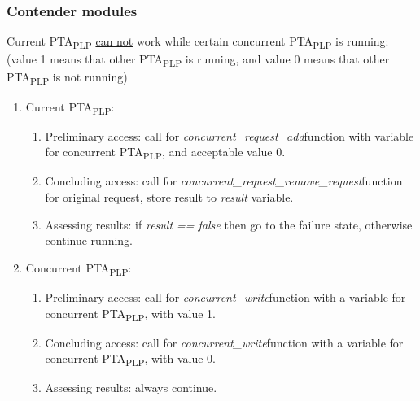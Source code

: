 \subsubsection{Contender modules \label{memory_module_applications_contender_modules}}
Current PTA\textsubscript{PLP} \underline{can not} work while certain concurrent PTA\textsubscript{PLP} is running: (value 1 means that other PTA\textsubscript{PLP} is running, and value 0 means that other PTA\textsubscript{PLP} is not running)
\begin{enumerate}  
\item Current PTA\textsubscript{PLP}:
\begin{enumerate}  
\item Preliminary access: call for \textcolor{ColorUppaalFunction}{\textit{concurrent_request_add}}​ function with variable for concurrent PTA\textsubscript{PLP}, and acceptable value 0.  
\item Concluding access: call for \textcolor{ColorUppaalFunction}{\textit{concurrent_request_remove_request}}​ function for original request, store result to \textcolor{ColorEdgeGuard}{\textit{result}} variable.  
\item Assessing results: if \textcolor{ColorEdgeGuard}{\textit{result == false}} then go to the failure state, otherwise continue running.
\end{enumerate}  
\item Concurrent PTA\textsubscript{PLP}:
\begin{enumerate}  
\item Preliminary access: call for \textcolor{ColorUppaalFunction}{\textit{concurrent_write}}​ function with a variable for concurrent PTA\textsubscript{PLP}, with value 1.  
\item Concluding access: call for \textcolor{ColorUppaalFunction}{\textit{concurrent_write}}​ function with a variable for concurrent PTA\textsubscript{PLP}, with value 0.  
\item Assessing results: always continue.
\end{enumerate}
\end{enumerate}
